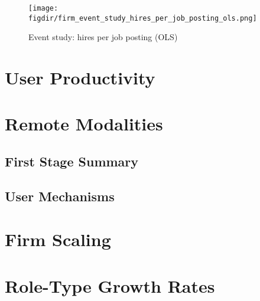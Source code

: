 \documentclass{article}
\newcommand{\cleanedresultsdir}{../../results/cleaned}
\newcommand{\figdir}{../../results/figures}
\begin{document}
\begin{figure}[H]
  \centering
  \texttt{[image: \\figdir/firm\_event\_study\_hires\_per\_job\_posting\_ols.png]}
  \caption{Event study: hires per job posting (OLS)}
\end{figure}

\section{User Productivity}
\begin{table}[H]
  \centering
  
\end{table}

\section{Remote Modalities}
\begin{table}[H]
  \centering
  
\end{table}

\begin{landscape}
\section{First Stage Summary}
\begin{table}[H]
  \centering
  
\end{table}
\end{landscape}

\begin{landscape}
\section{User Mechanisms}
\begin{table}[H]
  \centering
  
\end{table}
\end{landscape}

\begin{landscape}
\section{Firm Scaling}
\begin{table}[H]
  \centering
  
\end{table}

\section{Role-Type Growth Rates}
\begin{table}[H]
  \centering
  
\end{table}
\end{landscape}
\end{document}
